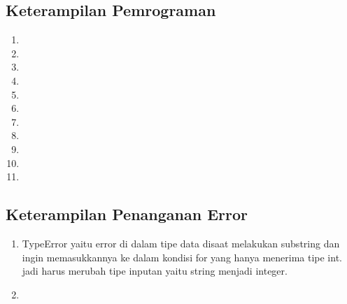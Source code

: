 	\subsection{Keterampilan Pemrograman}
		\begin{enumerate}
			\item 

			\item 

			\item 

			\item 

			\item 

			\item 

			\item 

			\item 

			\item 

			\item 
			
			\item 
		\end{enumerate}
		
	\subsection{Keterampilan Penanganan Error}
		\begin{enumerate}
			\item TypeError yaitu error di dalam tipe data disaat melakukan substring dan ingin memasukkannya ke dalam kondisi for 
			yang hanya menerima tipe int. jadi harus merubah tipe inputan yaitu string menjadi integer.

			\item 
		\end{enumerate}